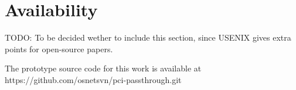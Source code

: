 \section*{Availability}
TODO: To be decided wether to include this section, since USENIX gives extra points for open-source papers.

The prototype source code for this work is available at https://github.com/osnetsvn/pci-passthrough.git


